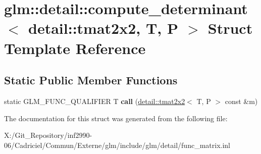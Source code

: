 \hypertarget{structglm_1_1detail_1_1compute__determinant_3_01detail_1_1tmat2x2_00_01_t_00_01_p_01_4}{\section{glm\-:\-:detail\-:\-:compute\-\_\-determinant$<$ detail\-:\-:tmat2x2, T, P $>$ Struct Template Reference}
\label{structglm_1_1detail_1_1compute__determinant_3_01detail_1_1tmat2x2_00_01_t_00_01_p_01_4}
}
\subsection*{Static Public Member Functions}
\begin{DoxyCompactItemize}
\item 
\hypertarget{structglm_1_1detail_1_1compute__determinant_3_01detail_1_1tmat2x2_00_01_t_00_01_p_01_4_a58a62a3968a9af7acd4522972236742e}{static G\-L\-M\-\_\-\-F\-U\-N\-C\-\_\-\-Q\-U\-A\-L\-I\-F\-I\-E\-R T {\bfseries call} (\hyperlink{structglm_1_1detail_1_1tmat2x2}{detail\-::tmat2x2}$<$ T, P $>$ const \&m)}\label{structglm_1_1detail_1_1compute__determinant_3_01detail_1_1tmat2x2_00_01_t_00_01_p_01_4_a58a62a3968a9af7acd4522972236742e}

\end{DoxyCompactItemize}


The documentation for this struct was generated from the following file\-:\begin{DoxyCompactItemize}
\item 
X\-:/\-Git\-\_\-\-Repository/inf2990-\/06/\-Cadriciel/\-Commun/\-Externe/glm/include/glm/detail/func\-\_\-matrix.\-inl\end{DoxyCompactItemize}
